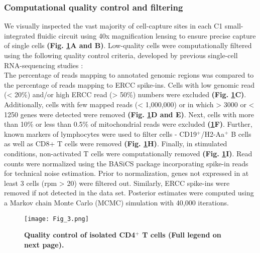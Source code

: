 \subsubsection*{Computational quality control and filtering}

We visually inspected the vast majority of cell-capture sites in each C1 small-integrated fluidic circuit using 40x magnification lensing to ensure precise capture of single cells \textbf{(Fig. \ref{fig1:QC}A and B)}. Low-quality cells were computationally filtered using the following quality control criteria, developed by previous single-cell RNA-sequencing studies \citep{Brennecke2015, Buettner2015, Scialdone2015, Vallejos2015}:\\
The percentage of reads mapping to annotated genomic regions was compared to the percentage of reads mapping to ERCC spike-ins. Cells with low genomic read (< 20\%) and/or high ERCC read (> 50\%) numbers were excluded \textbf{(Fig. \ref{fig1:QC}C)}. Additionally, cells with few mapped reads (< 1,000,000) or in which > 3000 or < 1250 genes were detected were removed \textbf{(Fig. \ref{fig1:QC}D and E)}. Next, cells with more than 10\% or less than 0.5\% of mitochondrial reads were excluded \textbf{(\ref{fig1:QC}F)}. Further, known markers of lymphocytes were used to filter cells - CD19$^+$/H2-Aa$^+$ B cells as well as CD8+ T cells were removed \textbf{(Fig. \ref{fig1:QC}H)}. Finally, in stimulated conditions, non-activated T cells were computationally removed \textbf{(Fig. \ref{fig1:QC}I)}. Read counts were normalized using the BASiCS package \citep{Vallejos2015} incorporating spike-in reads for technical noise estimation. Prior to normalization, genes not expressed in at least 3 cells (rpm > 20) were filtered out. Similarly, ERCC spike-ins were removed if not detected in the data set. Posterior estimates were computed using a Markov chain Monte Carlo (MCMC) simulation with 40,000 iterations.  

\begin{figure}[!hb]
\centering
\texttt{[image: Fig\_3.png]}
\caption[Quality control of isolated CD4$^+$ T cells]{\textbf{Quality control of isolated CD4$^+$ T cells (Full legend on next page).}}
\label{fig1:QC}
\end{figure}

\newpage

